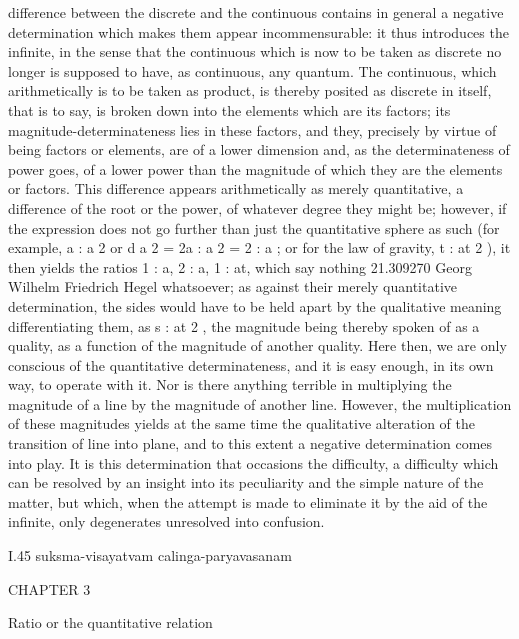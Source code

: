 difference between the discrete and the continuous contains in general a
negative determination which makes them appear incommensurable: it
thus introduces the infinite, in the sense that the continuous which is now
to be taken as discrete no longer is supposed to have, as continuous, any
quantum. The continuous, which arithmetically is to be taken as product,
is thereby posited as discrete in itself, that is to say, is broken down into
the elements which are its factors; its magnitude-determinateness lies in
these factors, and they, precisely by virtue of being factors or elements,
are of a lower dimension and, as the determinateness of power goes, of a
lower power than the magnitude of which they are the elements or factors.
This difference appears arithmetically as merely quantitative, a difference
of the root or the power, of whatever degree they might be; however, if
the expression does not go further than just the quantitative sphere as such
(for example, a : a 2 or d a 2 = 2a : a 2 = 2 : a ; or for the law of gravity,
t : at 2 ), it then yields the ratios 1 : a, 2 : a, 1 : at, which say nothing
21.309270
Georg Wilhelm Friedrich Hegel
whatsoever; as against their merely quantitative determination, the sides
would have to be held apart by the qualitative meaning differentiating
them, as s : at 2 , the magnitude being thereby spoken of as a quality, as
a function of the magnitude of another quality. Here then, we are only
conscious of the quantitative determinateness, and it is easy enough, in its
own way, to operate with it. Nor is there anything terrible in multiplying
the magnitude of a line by the magnitude of another line. However, the
multiplication of these magnitudes yields at the same time the qualitative
alteration of the transition of line into plane, and to this extent a negative
determination comes into play. It is this determination that occasions the
difficulty, a difficulty which can be resolved by an insight into its peculiarity
and the simple nature of the matter, but which, when the attempt is made
to eliminate it by the aid of the infinite, only degenerates unresolved into
confusion.

I.45
suksma-visayatvam calinga-paryavasanam

CHAPTER 3

Ratio or the quantitative relation

